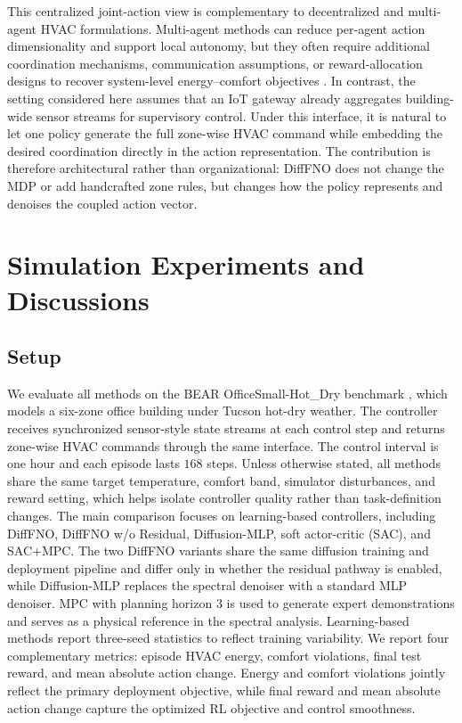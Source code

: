 ﻿\documentclass[conference]{IEEEtran}
\theoremstyle{nonumberplain}
\theoremstyle{plain}
\begin{document}
This centralized joint-action view is complementary to decentralized and multi-agent HVAC formulations. Multi-agent methods can reduce per-agent action dimensionality and support local autonomy, but they often require additional coordination mechanisms, communication assumptions, or reward-allocation designs to recover system-level energy--comfort objectives \cite{vazquez2020marlisa,yu2021multiagent,xue2025multi}. In contrast, the setting considered here assumes that an IoT gateway already aggregates building-wide sensor streams for supervisory control. Under this interface, it is natural to let one policy generate the full zone-wise HVAC command while embedding the desired coordination directly in the action representation. The contribution is therefore architectural rather than organizational: DiffFNO does not change the MDP or add handcrafted zone rules, but changes how the policy represents and denoises the coupled action vector.

\section{Simulation Experiments and Discussions}
\label{sec:experiments}

\subsection{Setup}

We evaluate all methods on the BEAR OfficeSmall-Hot\_Dry benchmark \cite{zhang2023bear}, which models a six-zone office building under Tucson hot-dry weather. The controller receives synchronized sensor-style state streams at each control step and returns zone-wise HVAC commands through the same interface. The control interval is one hour and each episode lasts $168$ steps. Unless otherwise stated, all methods share the same target temperature, comfort band, simulator disturbances, and reward setting, which helps isolate controller quality rather than task-definition changes. The main comparison focuses on learning-based controllers, including DiffFNO, DiffFNO w/o Residual, Diffusion-MLP, soft actor-critic (SAC), and SAC+MPC. The two DiffFNO variants share the same diffusion training and deployment pipeline and differ only in whether the residual pathway is enabled, while Diffusion-MLP replaces the spectral denoiser with a standard MLP denoiser. MPC with planning horizon $3$ is used to generate expert demonstrations and serves as a physical reference in the spectral analysis. Learning-based methods report three-seed statistics to reflect training variability. We report four complementary metrics: episode HVAC energy, comfort violations, final test reward, and mean absolute action change. Energy and comfort violations jointly reflect the primary deployment objective, while final reward and mean absolute action change capture the optimized RL objective and control smoothness.
\end{document}
